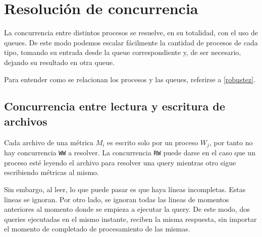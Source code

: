 \documentclass[a4paper,oneside]{article}
\begin{document}
\section{Resolución de concurrencia}
La concurrencia entre distintos procesos se resuelve, en su totalidad, con el uso de queues. De este modo podemos escalar fácilmente la cantidad de procesos de cada tipo, tomando su entrada desde la queue correspondiente y, de ser necesario, dejando su resultado en otra queue.

Para entender como se relacionan los procesos y las queues, referirse a \ref{robustez}.

\subsection{Concurrencia entre lectura y escritura de archivos}
Cada archivo de una métrica $M_i$ es escrito solo por un proceso $W_j$, por tanto no hay concurrencia \texttt{WW} a resolver. La concurrencia \texttt{RW} puede darse en el caso que un proceso esté leyendo el archivo para resolver una query mientras otro sigue escribiendo métricas al mismo.

Sin embargo, al leer, lo que puede pasar es que haya líneas incompletas. Estas lineas se ignoran. Por otro lado, se ignoran todas las lineas de momentos anteriores al momento donde se empieza a ejecutar la query. De este modo, dos queries ejecutadas en el mismo instante, reciben la misma respuesta, sin importar el momento de completado de procesamiento de las mismas.

\printbibliography
\end{document}
